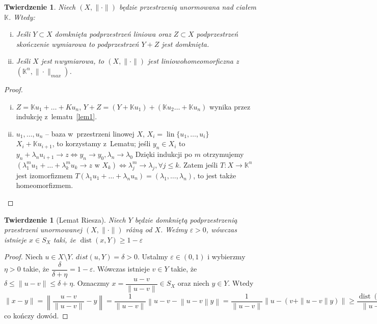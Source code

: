 \documentclass[11pt]{mwrep}
\renewcommand{\[}{\begin{equation}}
\renewcommand{\]}{\end{equation}}
\newcommand{\K}{\ensuremath{\mathbb{K}}}
\newcommand{\lin}{\operatorname{lin}}
\newcommand{\dist}{\operatorname{dist}}
\newtheorem{twr}[subsection]{Twierdzenie}%
\newcounter{numer}
\begin{document}
\begin{twr}
	Niech $(X,\|\cdot\|)$ będzie przestrzenią unormowana nad ciałem $\K$. Wtedy:
	\begin{enumerate}[(i)]
		\item Jeśli $Y\subset X$  domknięta podprzestrzeń liniowa oraz  $Z\subset X$ podprzestrzeń skończenie wymiarowa to podprzestrzeń $Y+ Z$ jest domknięta.
		\item Jeśli $X$ jest $n$\dywiz wymiarowa, to $(X,\|\cdot\|)$ jest liniowo\dywiz homeomorficzna z~$(\K^n, \|\cdot\|_{max})$.			
	\end{enumerate}
\end{twr}
\begin{proof}
	\begin{enumerate}[(i)]
	  \item $Z= \K u_1 + \ldots + K u_n$, $Y+Z = (Y+\K u_1) +(\K u_2 \ldots + \K u_n)$ wynika przez indukcję z~lematu~\ref{lem1}.  
		\item $u_1 , \ldots, u_n$ -- baza w~przestrzeni linowej $X$, $X_i = \lin\{ u_1, \ldots, u_i\}$ \\
			$X_i+\K u_{i+1}$, to korzystamy z~Lematu; jeśli $y_n \in X_i$ to 
			$ y_n + \lambda_n u_{i+1}  \to z \Leftrightarrow y_n \to y_0, \lambda_n \to \lambda_0$
			Dzięki indukcji po $m$ otrzymujemy 
			$(\lambda_1^m u_1 + \ldots + \lambda_k^m u_k\to z \textrm{ w } X_k) \Leftrightarrow \lambda_j^m \to \lambda_j,\forall j \le k$.
			Zatem jeśli $T:X  \to \K^n$ jest izomorfizmem 
			$T\left( \lambda_1 u_1 + \ldots + \lambda_n u_n  \right) = \left( \lambda_1,\ldots,\lambda_n \right)$,
			to jest także homeomorfizmem.
	\end{enumerate}
\end{proof}
\begin{twr}[Lemat Riesza]
	Niech $Y$ będzie domkniętą podprzestrzenią przestrzeni unormowanej $(X,\|\cdot\|)$ różną od $X$. Weźmy $\varepsilon>0$, 
	wówczas istnieje $x\in S_X$ taki, że $\dist(x,Y)\ge 1 -\varepsilon$
\end{twr}
\begin{proof}
	Niech $u \in X\setminus Y$. $dist(u,Y) = \delta>0$. Ustalmy $\varepsilon\in (0,1)$ i wybierzmy $\eta>0$ takie, że 
	$\dfrac{\delta}{\delta+\eta}=1- \varepsilon$. Wówczas istnieje $v\in Y$ takie, że
	$\delta\le \|u-v\| \le \delta+\eta$.
	Oznaczmy $x= \dfrac{u-v}{\|u-v\|} \in S_X$ 
	oraz niech $y\in Y$. Wtedy $\|x-y\|= \left\|\dfrac{u-v}{\|u-v\|} - y\right\|= \dfrac{1}{\|u-v\|} \left\|u-v-\left\|u-v\right\|y\right\|= 
	\dfrac{1}{\|u-v\|} \left\|u- \left( v+ \|u-v\| y \right)\right\| \ge \dfrac{\dist(u,Y)}{\|u-v\|} \ge \dfrac{\delta}{\delta+\eta} = 1 -\varepsilon$ co kończy dowód.
\end{proof}
\end{document}
